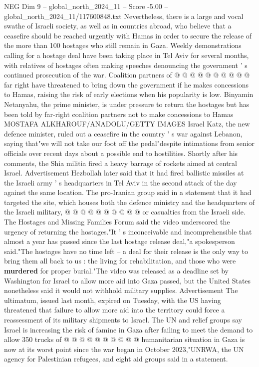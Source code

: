 \begin{textsample}{NEG Dim 9 – global\_north\_2024\_11 – Score -5.00 – global\_north\_2024\_11/117600848.txt}
Nevertheless, there is a large and vocal swathe of Israeli society, as well as in countries abroad, who believe that a ceasefire should be reached urgently with Hamas in order to secure the release of the more than 100 hostages who still remain in Gaza.
Weekly demonstrations calling for a hostage deal have been taking place in Tel Aviv for several months, with relatives of hostages often making speeches denouncing the government ' s continued prosecution of the war.
Coalition partners of @ @ @ @ @ @ @ @ @ @ far right have threatened to bring down the government if he makes concessions to Hamas, raising the risk of early elections when his popularity is low.
Binyamin Netanyahu, the prime minister, is under pressure to return the hostages but has been told by far-right coalition partners not to make concessions to Hamas MOSTAFA ALKHAROUF/ANADOLU/GETTY IMAGES Israel Katz, the new defence minister, ruled out a ceasefire in the country ' s war against Lebanon, saying that"we will not take our foot off the pedal"despite intimations from senior officials over recent days about a possible end to hostilities.
Shortly after his comments, the Shia militia fired a heavy barrage of rockets aimed at central Israel.
Advertisement Hezbollah later said that it had fired ballistic missiles at the Israeli army ' s headquarters in Tel Aviv in the second attack of the day against the same location.
The pro-Iranian group said in a statement that it had targeted the site, which houses both the defence ministry and the headquarters of the Israeli military, @ @ @ @ @ @ @ @ @ @ or casualties from the Israeli side.
The Hostages and Missing Families Forum said the video underscored the urgency of returning the hostages."It ' s inconceivable and incomprehensible that almost a year has passed since the last hostage release deal,"a spokesperson said."The hostages have no time left -- a deal for their release is the only way to bring them all back to us : the living for rehabilitation, and those who were \textbf{murdered} for proper burial."The video was released as a deadline set by Washington for Israel to allow more aid into Gaza passed, but the United States nonetheless said it would not withhold military supplies.
Advertisement The ultimatum, issued last month, expired on Tuesday, with the US having threatened that failure to allow more aid into the territory could force a reassessment of its military shipments to Israel.
The UN and relief groups say Israel is increasing the risk of famine in Gaza after failing to meet the demand to allow 350 trucks of @ @ @ @ @ @ @ @ @ @ humanitarian situation in Gaza is now at its worst point since the war began in October 2023,"UNRWA, the UN agency for Palestinian refugees, and eight aid groups said in a statement.

\end{textsample}
